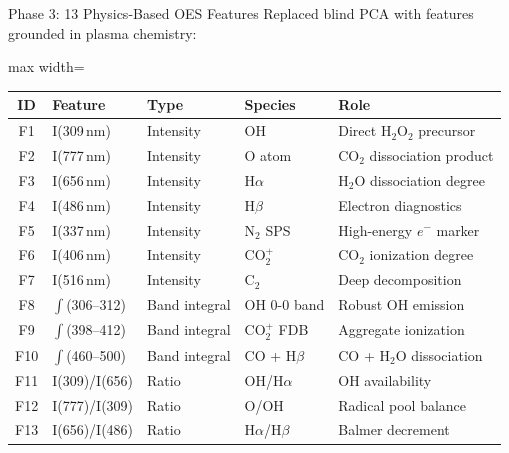 \documentclass{libs/XJTLU_format}
\begin{document}
\begin{frame}{Phase 3: 13 Physics-Based OES Features}
    Replaced blind PCA with features grounded in plasma chemistry:
    \vspace{0.3em}
    \begin{adjustbox}{max width=\textwidth}
    \small
    \begin{tabular}{@{}cllll@{}}
        \toprule
        \textbf{ID} & \textbf{Feature} & \textbf{Type} & \textbf{Species} & \textbf{Role} \\
        \midrule
        F1  & I(309\,nm)        & Intensity & OH        & Direct H$_2$O$_2$ precursor \\
        F2  & I(777\,nm)        & Intensity & O atom    & CO$_2$ dissociation product \\
        F3  & I(656\,nm)        & Intensity & H$\alpha$ & H$_2$O dissociation degree \\
        F4  & I(486\,nm)        & Intensity & H$\beta$  & Electron diagnostics \\
        F5  & I(337\,nm)        & Intensity & N$_2$ SPS & High-energy $e^-$ marker \\
        F6  & I(406\,nm)        & Intensity & CO$_2^+$  & CO$_2$ ionization degree \\
        F7  & I(516\,nm)        & Intensity & C$_2$     & Deep decomposition \\
        \midrule
        F8  & $\int$(306--312)   & Band integral & OH 0-0 band    & Robust OH emission \\
        F9  & $\int$(398--412)   & Band integral & CO$_2^+$ FDB   & Aggregate ionization \\
        F10 & $\int$(460--500)   & Band integral & CO + H$\beta$  & CO + H$_2$O dissociation \\
        \midrule
        F11 & I(309)/I(656)     & Ratio & OH/H$\alpha$           & OH availability \\
        F12 & I(777)/I(309)     & Ratio & O/OH                   & Radical pool balance \\
        F13 & I(656)/I(486)     & Ratio & H$\alpha$/H$\beta$     & Balmer decrement \\
        \bottomrule
    \end{tabular}
    \end{adjustbox}
\end{frame}
\end{document}
